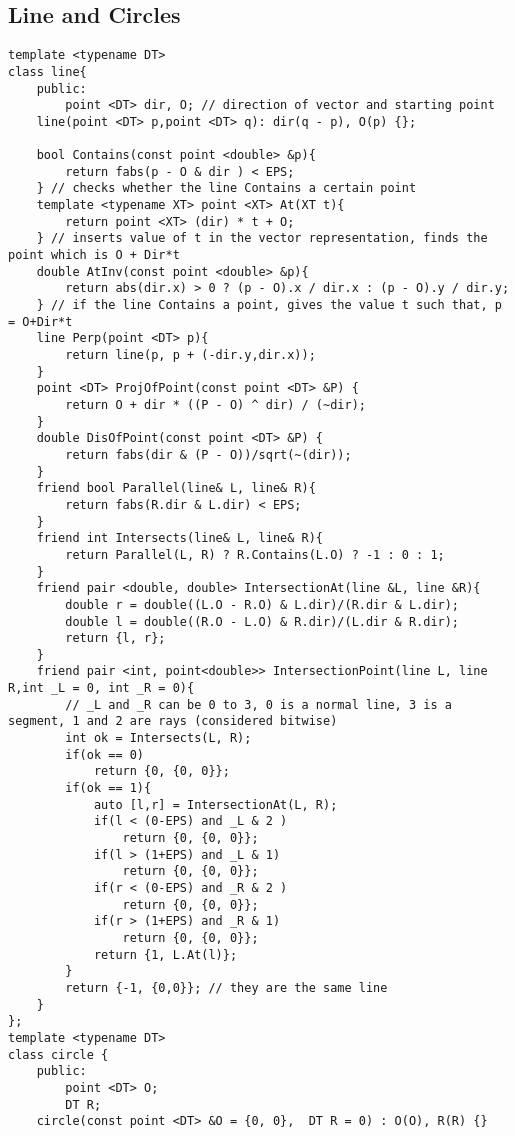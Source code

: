 \documentclass[10pt,a4paper,onesided]{article}
\begin{document}
\begin{multicols*}{3}
\subsection{Line and Circles}
\begin{lstlisting}
template <typename DT>
class line{
    public:
        point <DT> dir, O; // direction of vector and starting point
    line(point <DT> p,point <DT> q): dir(q - p), O(p) {};

    bool Contains(const point <double> &p){ 
        return fabs(p - O & dir ) < EPS;
    } // checks whether the line Contains a certain point
    template <typename XT> point <XT> At(XT t){
        return point <XT> (dir) * t + O;
    } // inserts value of t in the vector representation, finds the point which is O + Dir*t
    double AtInv(const point <double> &p){
        return abs(dir.x) > 0 ? (p - O).x / dir.x : (p - O).y / dir.y;
    } // if the line Contains a point, gives the value t such that, p = O+Dir*t
    line Perp(point <DT> p){
        return line(p, p + (-dir.y,dir.x));
    }
    point <DT> ProjOfPoint(const point <DT> &P) {
        return O + dir * ((P - O) ^ dir) / (~dir);
    }
    double DisOfPoint(const point <DT> &P) {
        return fabs(dir & (P - O))/sqrt(~(dir));   
    }
    friend bool Parallel(line& L, line& R){
        return fabs(R.dir & L.dir) < EPS;
    }
    friend int Intersects(line& L, line& R){
        return Parallel(L, R) ? R.Contains(L.O) ? -1 : 0 : 1;
    }
    friend pair <double, double> IntersectionAt(line &L, line &R){
        double r = double((L.O - R.O) & L.dir)/(R.dir & L.dir);
        double l = double((R.O - L.O) & R.dir)/(L.dir & R.dir);
        return {l, r};
    }
    friend pair <int, point<double>> IntersectionPoint(line L, line R,int _L = 0, int _R = 0){
        // _L and _R can be 0 to 3, 0 is a normal line, 3 is a segment, 1 and 2 are rays (considered bitwise)
        int ok = Intersects(L, R);
        if(ok == 0)
            return {0, {0, 0}};
        if(ok == 1){
            auto [l,r] = IntersectionAt(L, R);
            if(l < (0-EPS) and _L & 2 )
                return {0, {0, 0}};
            if(l > (1+EPS) and _L & 1)
                return {0, {0, 0}};
            if(r < (0-EPS) and _R & 2 )
                return {0, {0, 0}};
            if(r > (1+EPS) and _R & 1)
                return {0, {0, 0}};
            return {1, L.At(l)};
        }
        return {-1, {0,0}}; // they are the same line
    }
};
template <typename DT> 
class circle {
    public:
        point <DT> O;
        DT R;
    circle(const point <DT> &O = {0, 0},  DT R = 0) : O(O), R(R) {}

\end{lstlisting}
\end{multicols*}
\end{document}
